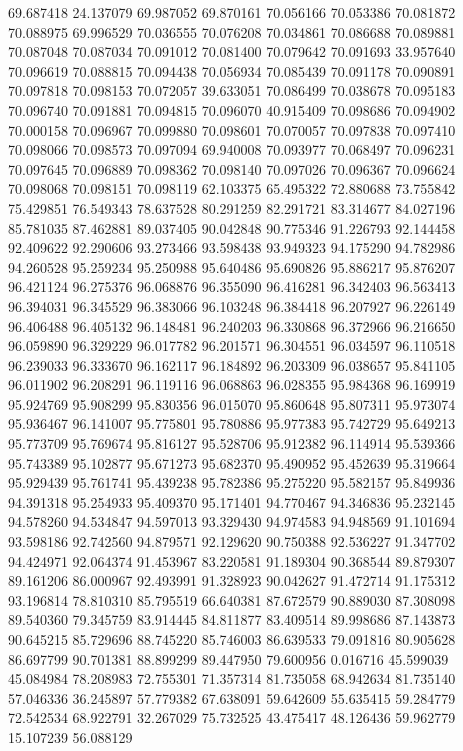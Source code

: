 69.687418
24.137079
69.987052
69.870161
70.056166
70.053386
70.081872
70.088975
69.996529
70.036555
70.076208
70.034861
70.086688
70.089881
70.087048
70.087034
70.091012
70.081400
70.079642
70.091693
33.957640
70.096619
70.088815
70.094438
70.056934
70.085439
70.091178
70.090891
70.097818
70.098153
70.072057
39.633051
70.086499
70.038678
70.095183
70.096740
70.091881
70.094815
70.096070
40.915409
70.098686
70.094902
70.000158
70.096967
70.099880
70.098601
70.070057
70.097838
70.097410
70.098066
70.098573
70.097094
69.940008
70.093977
70.068497
70.096231
70.097645
70.096889
70.098362
70.098140
70.097026
70.096367
70.096624
70.098068
70.098151
70.098119
62.103375
65.495322
72.880688
73.755842
75.429851
76.549343
78.637528
80.291259
82.291721
83.314677
84.027196
85.781035
87.462881
89.037405
90.042848
90.775346
91.226793
92.144458
92.409622
92.290606
93.273466
93.598438
93.949323
94.175290
94.782986
94.260528
95.259234
95.250988
95.640486
95.690826
95.886217
95.876207
96.421124
96.275376
96.068876
96.355090
96.416281
96.342403
96.563413
96.394031
96.345529
96.383066
96.103248
96.384418
96.207927
96.226149
96.406488
96.405132
96.148481
96.240203
96.330868
96.372966
96.216650
96.059890
96.329229
96.017782
96.201571
96.304551
96.034597
96.110518
96.239033
96.333670
96.162117
96.184892
96.203309
96.038657
95.841105
96.011902
96.208291
96.119116
96.068863
96.028355
95.984368
96.169919
95.924769
95.908299
95.830356
96.015070
95.860648
95.807311
95.973074
95.936467
96.141007
95.775801
95.780886
95.977383
95.742729
95.649213
95.773709
95.769674
95.816127
95.528706
95.912382
96.114914
95.539366
95.743389
95.102877
95.671273
95.682370
95.490952
95.452639
95.319664
95.929439
95.761741
95.439238
95.782386
95.275220
95.582157
95.849936
94.391318
95.254933
95.409370
95.171401
94.770467
94.346836
95.232145
94.578260
94.534847
94.597013
93.329430
94.974583
94.948569
91.101694
93.598186
92.742560
94.879571
92.129620
90.750388
92.536227
91.347702
94.424971
92.064374
91.453967
83.220581
91.189304
90.368544
89.879307
89.161206
86.000967
92.493991
91.328923
90.042627
91.472714
91.175312
93.196814
78.810310
85.795519
66.640381
87.672579
90.889030
87.308098
89.540360
79.345759
83.914445
84.811877
83.409514
89.998686
87.143873
90.645215
85.729696
88.745220
85.746003
86.639533
79.091816
80.905628
86.697799
90.701381
88.899299
89.447950
79.600956
0.016716
45.599039
45.084984
78.208983
72.755301
71.357314
81.735058
68.942634
81.735140
57.046336
36.245897
57.779382
67.638091
59.642609
55.635415
59.284779
72.542534
68.922791
32.267029
75.732525
43.475417
48.126436
59.962779
15.107239
56.088129
